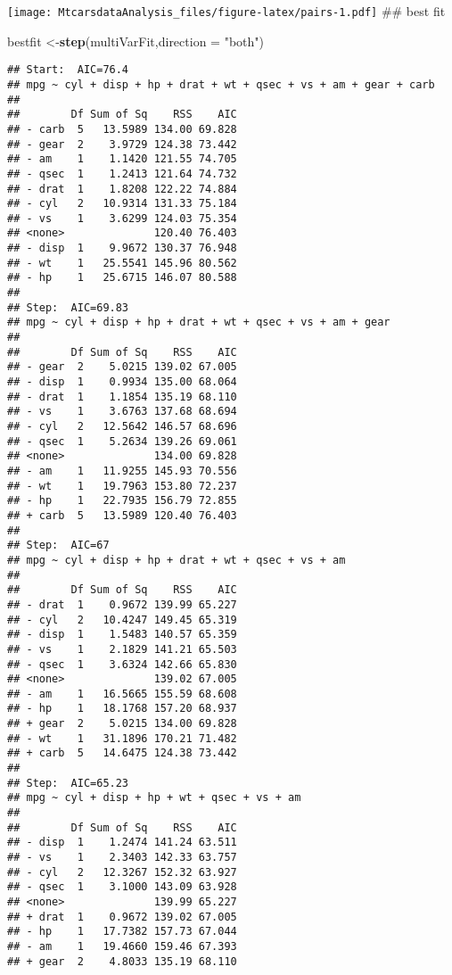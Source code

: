 \documentclass[
]{article}
\newenvironment{Shaded}{\begin{snugshade}}{\end{snugshade}}
\newcommand{\DataTypeTok}[1]{\textcolor[rgb]{0.13,0.29,0.53}{#1}}
\newcommand{\KeywordTok}[1]{\textcolor[rgb]{0.13,0.29,0.53}{\textbf{#1}}}
\newcommand{\NormalTok}[1]{#1}
\newcommand{\StringTok}[1]{\textcolor[rgb]{0.31,0.60,0.02}{#1}}
\begin{document}
\texttt{[image: MtcarsdataAnalysis\_files/figure-latex/pairs-1.pdf]} \#\#
best fit

\begin{Shaded}
\begin{Highlighting}[]
\NormalTok{bestfit <-}\KeywordTok{step}\NormalTok{(multiVarFit,}\DataTypeTok{direction =} \StringTok{"both"}\NormalTok{)}
\end{Highlighting}
\end{Shaded}

\begin{verbatim}
## Start:  AIC=76.4
## mpg ~ cyl + disp + hp + drat + wt + qsec + vs + am + gear + carb
## 
##        Df Sum of Sq    RSS    AIC
## - carb  5   13.5989 134.00 69.828
## - gear  2    3.9729 124.38 73.442
## - am    1    1.1420 121.55 74.705
## - qsec  1    1.2413 121.64 74.732
## - drat  1    1.8208 122.22 74.884
## - cyl   2   10.9314 131.33 75.184
## - vs    1    3.6299 124.03 75.354
## <none>              120.40 76.403
## - disp  1    9.9672 130.37 76.948
## - wt    1   25.5541 145.96 80.562
## - hp    1   25.6715 146.07 80.588
## 
## Step:  AIC=69.83
## mpg ~ cyl + disp + hp + drat + wt + qsec + vs + am + gear
## 
##        Df Sum of Sq    RSS    AIC
## - gear  2    5.0215 139.02 67.005
## - disp  1    0.9934 135.00 68.064
## - drat  1    1.1854 135.19 68.110
## - vs    1    3.6763 137.68 68.694
## - cyl   2   12.5642 146.57 68.696
## - qsec  1    5.2634 139.26 69.061
## <none>              134.00 69.828
## - am    1   11.9255 145.93 70.556
## - wt    1   19.7963 153.80 72.237
## - hp    1   22.7935 156.79 72.855
## + carb  5   13.5989 120.40 76.403
## 
## Step:  AIC=67
## mpg ~ cyl + disp + hp + drat + wt + qsec + vs + am
## 
##        Df Sum of Sq    RSS    AIC
## - drat  1    0.9672 139.99 65.227
## - cyl   2   10.4247 149.45 65.319
## - disp  1    1.5483 140.57 65.359
## - vs    1    2.1829 141.21 65.503
## - qsec  1    3.6324 142.66 65.830
## <none>              139.02 67.005
## - am    1   16.5665 155.59 68.608
## - hp    1   18.1768 157.20 68.937
## + gear  2    5.0215 134.00 69.828
## - wt    1   31.1896 170.21 71.482
## + carb  5   14.6475 124.38 73.442
## 
## Step:  AIC=65.23
## mpg ~ cyl + disp + hp + wt + qsec + vs + am
## 
##        Df Sum of Sq    RSS    AIC
## - disp  1    1.2474 141.24 63.511
## - vs    1    2.3403 142.33 63.757
## - cyl   2   12.3267 152.32 63.927
## - qsec  1    3.1000 143.09 63.928
## <none>              139.99 65.227
## + drat  1    0.9672 139.02 67.005
## - hp    1   17.7382 157.73 67.044
## - am    1   19.4660 159.46 67.393
## + gear  2    4.8033 135.19 68.110

\end{verbatim}
\end{document}
